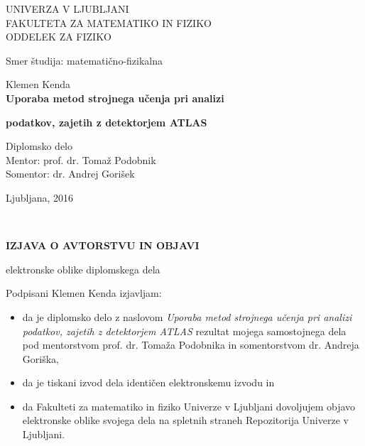 
\thispagestyle{empty} 
\begin{center}
{\large 
UNIVERZA V LJUBLJANI\\
FAKULTETA ZA MATEMATIKO IN FIZIKO\\
ODDELEK ZA FIZIKO
}

Smer študija: matematično-fizikalna

\vspace{5cm}
{\Large Klemen Kenda}\\

\vspace{2cm}
\textbf{\LARGE Uporaba metod strojnega učenja pri analizi}
\vspace{0.1cm} 

\textbf{\LARGE podatkov, zajetih z detektorjem ATLAS}

\vspace{1cm}
{ \Large Diplomsko delo }\\

\vspace{6cm} 
{\Large Mentor: prof. dr. Tomaž Podobnik} \\
{\Large Somentor: dr. Andrej Gorišek}

\vfill
{\Large Ljubljana, 2016}
\end{center}

\newpage

\ \thispagestyle{empty}
\newpage

\thispagestyle{empty}

\vspace{1cm}
\begin{center} 
{\Large \textbf{IZJAVA O AVTORSTVU IN OBJAVI}}
\end{center}

\begin{center} 
{\Large elektronske oblike diplomskega dela}
\end{center}

\vspace{1cm}
Podpisani Klemen Kenda izjavljam:

\begin{itemize}
	\item da je diplomsko delo z naslovom \textit{Uporaba metod strojnega učenja pri analizi podatkov, zajetih z detektorjem ATLAS} rezultat mojega samostojnega dela pod mentorstvom prof. dr. Tomaža Podobnika in somentorstvom dr. Andreja Goriška,
	\item da je tiskani izvod dela identičen elektronskemu izvodu in 
	\item da Fakulteti za matematiko in fiziko Univerze v Ljubljani dovoljujem objavo elektronske oblike svojega dela na spletnih straneh Repozitorija Univerze v Ljubljani.
\end{itemize}

